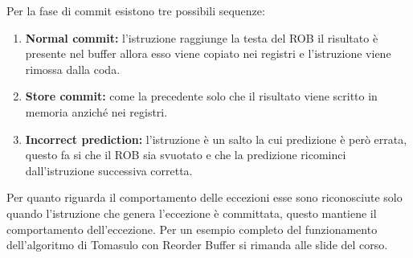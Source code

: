Per la fase di commit esistono tre possibili sequenze: 
\begin{enumerate}
\item \textbf{Normal commit:} l'istruzione raggiunge la testa del ROB il risultato è presente nel buffer allora esso viene copiato nei registri e l'istruzione viene rimossa dalla coda.
\item \textbf{Store commit:} come la precedente solo che il risultato viene scritto in memoria anziché nei registri.
\item \textbf{Incorrect prediction:} l'istruzione è un salto la cui predizione è però errata, questo fa si che il ROB sia svuotato e che la predizione ricominci dall'istruzione successiva corretta.
\end{enumerate}
Per quanto riguarda il comportamento delle eccezioni esse sono riconosciute solo quando l'istruzione che genera l'eccezione è committata, questo mantiene il comportamento dell'eccezione.
Per un esempio completo del funzionamento dell'algoritmo di Tomasulo con Reorder Buffer si rimanda alle slide del corso.
